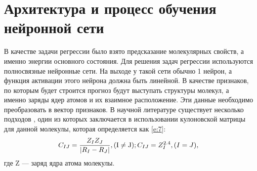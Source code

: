 \section{Архитектура и процесс обучения нейронной сети}
В качестве задачи регрессии было взято предсказание молекулярных свойств, а именно энергии основного состояния. Для решения задач регрессии используются полносвязные нейронные сети. На выходе у такой сети обычно 1 нейрон, а функция активации этого нейрона должна быть линейной. В качестве признаков, по которым будет строится прогноз будут выступать структуры молекул, а именно заряды ядер атомов и их взаимное расположение. Эти данные необходимо преобразовать в вектор признаков. В научной литературе существует несколько подходов \cite{26, 27, 28}, один из которых заключается в использовании кулоновской матрицы для данной молекулы, которая определяется как \ref{e:7}:
\begin{equation} \label{e:7}
    C_{IJ} = \frac{Z_I Z_J}{\vert R_I - R_J \vert}, ({\rm I \neq J});
    C_{IJ} = Z_I^{2.4}, (I=J),
\end{equation}
где Z — заряд ядра атома молекулы.

